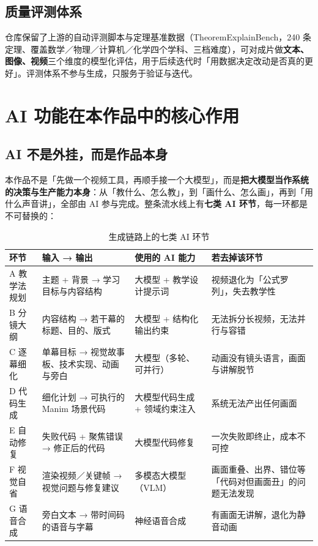 \documentclass[11pt,a4paper]{ctexart}
\begin{document}
\subsection{质量评测体系}

仓库保留了上游的自动评测脚本与定理基准数据（TheoremExplainBench，240 条定理、覆盖数学／物理／计算机／化学四个学科、三档难度），可对成片做\textbf{文本、图像、视频}三个维度的模型化评估，用于后续迭代时「用数据决定改动是否真的更好」。评测体系不参与生成，只服务于验证与迭代。

\section{AI 功能在本作品中的核心作用}

\subsection{AI 不是外挂，而是作品本身}

本作品不是「先做一个视频工具，再顺手接一个大模型」，而是\textbf{把大模型当作系统的决策与生产能力本身}：从「教什么、怎么教」，到「画什么、怎么画」，再到「用什么声音讲」，全部由 AI 参与完成。整条流水线上有\textbf{七类 AI 环节}，每一环都是不可替换的：

\begin{table}[htbp]
\centering
\small
\caption{生成链路上的七类 AI 环节}
\begin{tabularx}{\textwidth}{@{}p{2.5cm} p{3.5cm} p{3.1cm} X@{}}
\toprule
\textbf{环节} & \textbf{输入 → 输出} & \textbf{使用的 AI 能力} & \textbf{若去掉该环节} \\
\midrule
A 教学法规划 & 主题 + 背景 → 学习目标与内容结构 & 大模型 + 教学设计提示词 & 视频退化为「公式罗列」，失去教学性 \\
B 分镜大纲 & 内容结构 → 若干幕的标题、目的、版式 & 大模型 + 结构化输出约束 & 无法拆分长视频，无法并行与容错 \\
C 逐幕细化 & 单幕目标 → 视觉故事板、技术实现、动画与旁白 & 大模型（多轮、可并行） & 动画没有镜头语言，画面与讲解脱节 \\
D 代码生成 & 细化计划 → 可执行的 Manim 场景代码 & 大模型代码生成 + 领域约束注入 & 系统无法产出任何画面 \\
E 自动修复 & 失败代码 + 聚焦错误 → 修正后的代码 & 大模型代码修复 & 一次失败即终止，成本不可控 \\
F 视觉自省 & 渲染视频／关键帧 → 视觉问题与修复建议 & 多模态大模型（VLM） & 画面重叠、出界、错位等「代码对但画面丑」的问题无法发现 \\
G 语音合成 & 旁白文本 → 带时间码的语音与字幕 & 神经语音合成 & 有画面无讲解，退化为静音动画 \\
\bottomrule
\end{tabularx}
\end{table}
\end{document}
